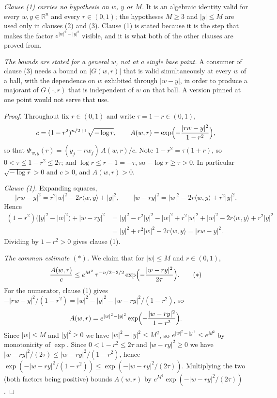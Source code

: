 \begin{lemma}
\emph{Clause (1) carries no hypothesis on $w$, $y$ or $M$.}  It is an algebraic
identity valid for every $w,y \in \mathbb{R}^n$ and every $r \in (0,1)$; the
hypotheses $M \geq 3$ and $|y| \leq M$ are used only in clauses (2) and (3).
Clause (1) is stated because it is the step that makes the factor
$e^{|w|^2-|y|^2}$ visible, and it is what both of the other clauses are proved
from.

\emph{The bounds are stated for a general $w$, not at a single base point.}  A
consumer of clause (3) needs a bound on $|G(w,r)|$ that is valid simultaneously
at every $w$ of a ball, with the dependence on $w$ exhibited through $|w-y|$,
in order to produce a majorant of $G(\cdot,r)$ that is independent of $w$ on
that ball.  A version pinned at one point would not serve that use.
\end{lemma}
\begin{proof}
Throughout fix $r \in (0,1)$ and write $\tau = 1-r \in (0,1)$,
\[
  c = (1-r^2)^{n/2+1}\sqrt{-\log r},
  \qquad
  A(w,r) = \exp\Bigl(-\frac{|rw-y|^2}{1-r^2}\Bigr) ,
\]
so that $\Phi_{w,y}(r) = (y_j - r w_j)\,A(w,r)/c$.  Note $1-r^2 = \tau(1+r)$, so
$0 < \tau \leq 1-r^2 \leq 2\tau$; and $\log r \leq r-1 = -\tau$, so
$-\log r \geq \tau > 0$.  In particular $\sqrt{-\log r} > 0$ and $c > 0$, and
$A(w,r) > 0$.

\emph{Clause (1).}  Expanding squares,
\[
  |rw-y|^2 = r^2|w|^2 - 2r\langle w,y\rangle + |y|^2,
  \qquad
  |w-ry|^2 = |w|^2 - 2r\langle w,y\rangle + r^2|y|^2 .
\]
Hence
\begin{align*}
  (1-r^2)\bigl(|y|^2-|w|^2\bigr) + |w-ry|^2
    &= |y|^2 - r^2|y|^2 - |w|^2 + r^2|w|^2
       + |w|^2 - 2r\langle w,y\rangle + r^2|y|^2 \\
    &= |y|^2 + r^2|w|^2 - 2r\langle w,y\rangle
     = |rw-y|^2 .
\end{align*}
Dividing by $1-r^2 > 0$ gives clause (1).

\emph{The common estimate $(\ast)$.}  We claim that for $|w| \leq M$ and
$r \in (0,1)$,
\[
  \frac{A(w,r)}{c}
    \leq e^{M^2}\,\tau^{-n/2-3/2}\exp\Bigl(-\frac{|w-ry|^2}{2\tau}\Bigr).
  \tag{$\ast$}
\]
For the numerator, clause (1) gives
$-|rw-y|^2/(1-r^2) = |w|^2 - |y|^2 - |w-ry|^2/(1-r^2)$, so
\[
  A(w,r) = e^{|w|^2-|y|^2}\exp\Bigl(-\frac{|w-ry|^2}{1-r^2}\Bigr) .
\]
Since $|w| \leq M$ and $|y|^2 \geq 0$ we have $|w|^2 - |y|^2 \leq M^2$, so
$e^{|w|^2-|y|^2} \leq e^{M^2}$ by monotonicity of $\exp$.  Since
$0 < 1-r^2 \leq 2\tau$ and $|w-ry|^2 \geq 0$ we have
$|w-ry|^2/(2\tau) \leq |w-ry|^2/(1-r^2)$, hence
$\exp(-|w-ry|^2/(1-r^2)) \leq \exp(-|w-ry|^2/(2\tau))$.  Multiplying the two
(both factors being positive) bounds $A(w,r)$ by
$e^{M^2}\exp(-|w-ry|^2/(2\tau))$.


\end{proof}
